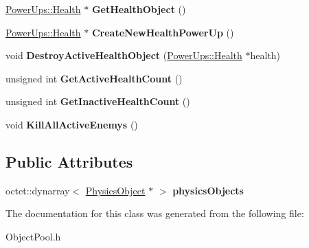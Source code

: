 \begin{DoxyCompactItemize}
\item 
\hypertarget{class_arena_1_1_object_pool_ac7ee019760c7fe46901042b1178ab4b3}{\hyperlink{class_arena_1_1_power_ups_1_1_health}{Power\+Ups\+::\+Health} $\ast$ {\bfseries Get\+Health\+Object} ()}\label{class_arena_1_1_object_pool_ac7ee019760c7fe46901042b1178ab4b3}

\item 
\hypertarget{class_arena_1_1_object_pool_a4b22fe8268ee2ccdd0aef130eb532273}{\hyperlink{class_arena_1_1_power_ups_1_1_health}{Power\+Ups\+::\+Health} $\ast$ {\bfseries Create\+New\+Health\+Power\+Up} ()}\label{class_arena_1_1_object_pool_a4b22fe8268ee2ccdd0aef130eb532273}

\item 
\hypertarget{class_arena_1_1_object_pool_ab1d1414d29b85601f90c5a1b40322d09}{void {\bfseries Destroy\+Active\+Health\+Object} (\hyperlink{class_arena_1_1_power_ups_1_1_health}{Power\+Ups\+::\+Health} $\ast$health)}\label{class_arena_1_1_object_pool_ab1d1414d29b85601f90c5a1b40322d09}

\item 
\hypertarget{class_arena_1_1_object_pool_a1ec8dbbcbc17e1b1249a758afa1ff412}{unsigned int {\bfseries Get\+Active\+Health\+Count} ()}\label{class_arena_1_1_object_pool_a1ec8dbbcbc17e1b1249a758afa1ff412}

\item 
\hypertarget{class_arena_1_1_object_pool_af9879fb32ef6ab15e790182e7f779afa}{unsigned int {\bfseries Get\+Inactive\+Health\+Count} ()}\label{class_arena_1_1_object_pool_af9879fb32ef6ab15e790182e7f779afa}

\item 
\hypertarget{class_arena_1_1_object_pool_a309055923d6e937777429639ba23cd93}{void {\bfseries Kill\+All\+Active\+Enemys} ()}\label{class_arena_1_1_object_pool_a309055923d6e937777429639ba23cd93}

\end{DoxyCompactItemize}
\subsection*{Public Attributes}
\begin{DoxyCompactItemize}
\item 
\hypertarget{class_arena_1_1_object_pool_a64f65a690d7663a93594e527a3f4c7a1}{octet\+::dynarray$<$ \hyperlink{class_arena_1_1_physics_object}{Physics\+Object} $\ast$ $>$ {\bfseries physics\+Objects}}\label{class_arena_1_1_object_pool_a64f65a690d7663a93594e527a3f4c7a1}

\end{DoxyCompactItemize}


The documentation for this class was generated from the following file\+:\begin{DoxyCompactItemize}
\item 
Object\+Pool.\+h\end{DoxyCompactItemize}
